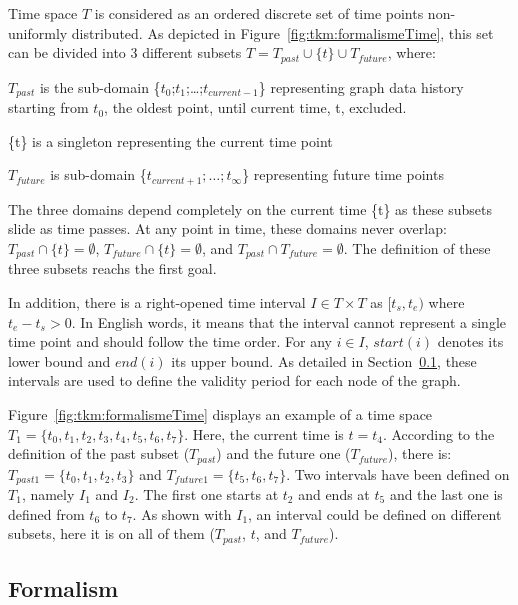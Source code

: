 Time space $T$ is considered as an ordered discrete set of time points non-uniformly distributed. 
As depicted in Figure~\ref{fig:tkm:formalismeTime}, this set can be divided into 3 different subsets $T = T_{past} \cup \{t\} \cup T_{future}$, where:  
\begin{condItemize}
	\item $T_{past}$ is the sub-domain \{$t_{0}$;$t_{1}$;\ldots;$t_{current-1}$\}  representing graph data history starting from $t_0$, the oldest point, until current time, t, excluded.
	\item \{t\} is a singleton representing the current time 
point
	\item $T_{future}$ is sub-domain \{$t_{current+1};\ldots;t_{\infty}$\} representing future time points 
\end{condItemize}
The three domains depend completely on the current time \{t\} as these subsets slide as time passes. 
At any point in time, these domains never overlap: $T_{past} \cap \{t\} = \emptyset$, $T_{future} \cap \{t\} =  \emptyset$, and $T_{past} \cap T_{future} = \emptyset$.
The definition of these three subsets reachs the first goal.

In addition, there is a right-opened time interval $I \in T \times T$ as $[t_s, t_e)$ where $t_e - t_s > 0$.
In English words, it means that the interval cannot represent a single time point and should follow the time order. 
For any $i \in I$, $start(i)$ denotes its lower bound and $end(i)$ its upper bound.
As detailed in Section~\ref{sec:tkm:formalism}, these intervals are used to define the validity period for each node of the graph. 

Figure~\ref{fig:tkm:formalismeTime} displays an example of a time space $T_1 = \{t_0, t_1, t_2, t_3, t_4, t_5, t_6, t_7\}$.
Here, the current time is $t = t_4$.
According to the definition of the past subset ($T_{past}$) and the future one ($T_{future}$), there is: $T_{past1} =  \{t_0, t_1, t_2, t_3\}$ and $T_{future1} = \{t_5, t_6, t_7\}$.
Two intervals have been defined on $T_1$, namely $I_1$ and $I_2$.
The first one starts at $t_2$ and ends at $t_5$ and the last one is defined from $t_6$ to $t_7$.
As shown with $I_1$, an interval could be defined on different subsets, here it is on all of them ($T_{past}$, $t$, and $T_{future}$).

\subsection{Formalism}
\label{sec:tkm:formalism}
 
